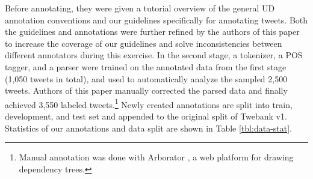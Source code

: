 \documentclass[11pt,a4paper]{article}
\newcommand{\yjcomment}[1]{\textcolor{orange}{[$_\mathrm{L}^\mathrm{Y}$#1]}}
\newcommand{\nascomment}[1]{\textcolor{blue}{[#1 ---\textsc{nas}]}}
\newcommand{\yicomment}[1]{\textcolor{gray}{[#1 ---\textsc{yi}]}}
\begin{document}
Before annotating, they were given a tutorial overview of the general UD
annotation conventions and our guidelines specifically for annotating tweets.
Both the guidelines and annotations
were further refined by the authors of this paper to increase
the coverage of our guidelines and solve inconsistencies between
different annotators during this exercise. In the second stage, a tokenizer, a POS tagger, and a
parser were trained on the annotated data from the first stage (1,050 tweets in total),
and used to automatically analyze the sampled 2,500 tweets.  Authors 
of this paper manually corrected the parsed data and finally achieved 3,550 labeled tweets.\footnote{Manual annotation was done with Arborator \cite{gerdes:2013:W13-37}, a web platform for drawing dependency trees.}
Newly created annotations are split into train, development, and test set and appended
to the original split of {\sc Twebank v1}. Statistics of our annotations and data split are shown
in Table \ref{tbl:data-stat}.

\end{document}
